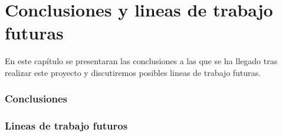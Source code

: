 %
%
%

\chapter{Conclusiones y lineas de trabajo futuras} \label{chap:Conclusiones} 

En este capítulo se presentaran las conclusiones a las que se ha llegado tras realizar este proyecto y discutiremos posibles lineas de trabajo futuras.

\subsection{Conclusiones}


\subsection{Lineas de trabajo futuros}



